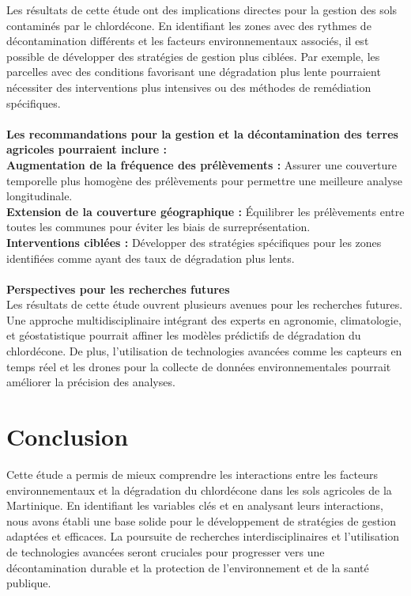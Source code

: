 \documentclass{report}
\begin{document}
Les résultats de cette étude ont des implications directes pour la gestion des sols contaminés par le chlordécone. En identifiant les zones avec des rythmes de décontamination différents et les facteurs environnementaux associés, il est possible de développer des stratégies de gestion plus ciblées. Par exemple, les parcelles avec des conditions favorisant une dégradation plus lente pourraient nécessiter des interventions plus intensives ou des méthodes de remédiation spécifiques.
\\\\
\large\textbf{Les recommandations pour la gestion et la décontamination des terres agricoles pourraient inclure :}\\
\large\textbf{Augmentation de la fréquence des prélèvements :} Assurer une couverture temporelle plus homogène des prélèvements pour permettre une meilleure analyse longitudinale.\\
\large\textbf{Extension de la couverture géographique :} Équilibrer les prélèvements entre toutes les communes pour éviter les biais de surreprésentation.\\
\large\textbf{Interventions ciblées :} Développer des stratégies spécifiques pour les zones identifiées comme ayant des taux de dégradation plus lents.\\\\
\Large\textbf{Perspectives pour les recherches futures}\\

Les résultats de cette étude ouvrent plusieurs avenues pour les recherches futures. Une approche multidisciplinaire intégrant des experts en agronomie, climatologie, et géostatistique pourrait affiner les modèles prédictifs de dégradation du chlordécone. De plus, l’utilisation de technologies avancées comme les capteurs en temps réel et les drones pour la collecte de données environnementales pourrait améliorer la précision des analyses.
\chapter*{Conclusion}
Cette étude a permis de mieux comprendre les interactions entre les facteurs environnementaux et la dégradation du chlordécone dans les sols agricoles de la Martinique. En identifiant les variables clés et en analysant leurs interactions, nous avons établi une base solide pour le développement de stratégies de gestion adaptées et efficaces. La poursuite de recherches interdisciplinaires et l'utilisation de technologies avancées seront cruciales pour progresser vers une décontamination durable et la protection de l'environnement et de la santé publique.





\end{document}
